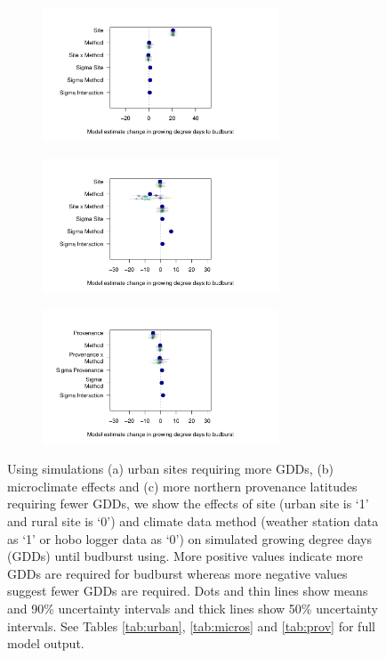 \documentclass{article}\usepackage[]{graphicx}\usepackage[]{color}
\begin{document}
  
\begin{figure}[H]
  \begin{subfigure}{.33\linewidth}
    \caption{}
      \centering
      \includegraphics[height=4cm, width=7cm]{..//analyses/figures/muplot_urban.pdf}
      \label{fig:muurban}
  \end{subfigure}%
    \begin{subfigure}{.33\linewidth}
      \caption{}
      \centering
      \includegraphics[height=4cm, width=7cm]{..//analyses/figures/muplot_micros.pdf}
    \label{fig:mumicros}
  \end{subfigure}
  \begin{subfigure}{.33\linewidth}
      \caption{}
      \centering
      \includegraphics[height=4cm, width=7cm]{..//analyses/figures/muplot_prov.pdf}
    \label{fig:muprov}
  \end{subfigure}
\caption{ Using simulations (a) urban sites requiring more GDDs, (b) microclimate effects and (c) more northern provenance latitudes requiring fewer GDDs, we show the effects of site (urban site is `1' and rural site is `0') and climate data method (weather station data as `1' or hobo logger data as `0') on simulated growing degree days (GDDs) until budburst using. More positive values indicate more GDDs are required for budburst whereas more negative values suggest fewer GDDs are required. Dots and thin lines show means and 90\% uncertainty intervals and thick lines show 50\% uncertainty intervals. See Tables \ref{tab:urban}, \ref{tab:micros} and \ref{tab:prov} for full model output. }
\label{fig:musims}
\end{figure}
  
\end{document}
